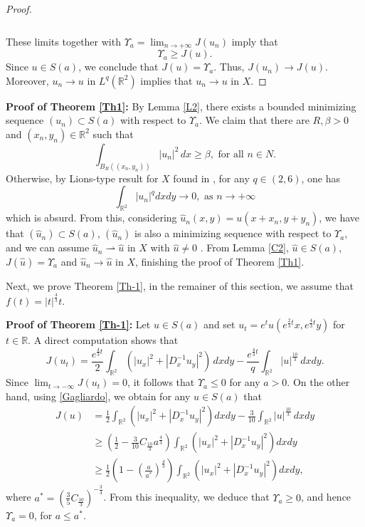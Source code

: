 \documentclass[11pt]{amsart}
\numberwithin{equation}{section}
\newcommand\R{\mathbb R}
\begin{document}
{{{\begin{proof}
\begin{align*}
\end{align*} \\
These limits together with $\Upsilon_a=\displaystyle \lim_{n \to +\infty}J(u_n)$ imply that
$$
\Upsilon_a \geq J(u).
$$
Since $u \in S(a)$, we conclude that $J(u)=\Upsilon_a$. Thus, $J(u_n) \to J(u)$.  Moreover, $u_n \to u$ in $L^{q}(\mathbb{R}^2)$ implies that $u_n \to u$ in $X$.
\end{proof}
\noindent\textbf{Proof of Theorem \ref{Th1}:}
{By Lemma \ref{L2},  there exists a bounded minimizing sequence $(u_n) \subset S(a)$ with respect to $\Upsilon_{a}$. We claim that there are $R,\beta>0$ and $(x_n, y_n) \in \mathbb{R}^2$ such that}
\begin{equation} \label{Lions}
\int_{B_R((x_n, y_n))}|u_n|^2\,dx \geq \beta, \,\, \text{for all}\,\, n \in N.
\end{equation}
Otherwise, by Lions-type result for $X$ found in \cite[Lemma 7.4]{Willem}, for any $q \in\left(2, 6\right)$, one has
$$
\int_{\mathbb{R}^{2}}|u_{n}|^{q} dx dy\rightarrow 0, \,\,\text{as}\,\, n \rightarrow +\infty
$$
which is absurd.  {From this, considering $\hat{u}_n(x, y)=u(x+x_n, y+y_n)$, we have that $(\hat{u}_n) \subset S(a)$,  $(\hat{u}_n)$ is also a minimizing sequence with respect to $\Upsilon_{a}$, and we can assume $\hat{u}_n \rightharpoonup \hat{u}$ in $X$ with $\hat{u} \not= 0$ . From Lemma \ref{C2}, $\hat{u} \in S(a)$, $J(\hat{u})=\Upsilon_a$ and $\hat{u}_n \to \hat{u}$ in $X$, finishing the proof of Theorem \ref{Th1}.}

{Next, we prove Theorem \ref{Th-1}, in the remainer of this section, we assume that $f(t)=|t|^{\frac{4}{3}}t$.}

{
\noindent\textbf{Proof of Theorem \ref{Th-1}:}
Let $u\in S(a)$ and set $u_t=e^{t}u(e^{\frac{2}{3}t}x,e^{\frac{4}{3}t}y) $ for $t\in\R$. {A direct computation shows that}
$$
J(u_t)=\frac{e^{\frac{4}{3}t}}{2}\int_{\mathbb{R}^2}\left(|u_x|^2+|D^{-1}_{x} u_{y}|^2\right)\,dxdy-\frac{e^{\frac{4}{3}t}}{q}\int_{\mathbb{R}^2}|u|^{\frac{10}{3}}\,dxdy.
$$
Since $\displaystyle \lim_{t \rightarrow-\infty}J(u_t)=0$, it follows that $\Upsilon_{a}\leq 0$ for any $a>0$. On the other hand,  using \eqref{Gagliardo}, {we obtain for any $u\in S(a)$ that}\label{key}
$$
\begin{aligned}
    J(u) & =\frac{1}{2}\int_{\mathbb{R}^{2}} \left(|u_{x}|^{2} + |D^{-1}_{x} u_{y}|^{2} \right)dx dy-\frac{3}{10}\int_{\mathbb{R}^2} |u|^{\frac{10}{3}} \,dxdy\\
    & \geq \left(\frac{1}{2}-
    \frac{3}{10}C_{\frac{10}{3}}a^{\frac{4}{3}}
    \right)\int_{\mathbb{R}^{2}} \left(|u_{x}|^{2} + |D^{-1}_{x} u_{y}|^{2} \right)dx dy\\
    & \geq \frac{1}{2}\left(1-
    \left(\frac{a}{a^*}\right)^{\frac{4}{3}}
    \right)\int_{\mathbb{R}^{2}} \left(|u_{x}|^{2} + |D^{-1}_{x} u_{y}|^{2} \right)dx dy,
\end{aligned}
$$
where $a^*=\left(\frac{3}{5}C_{\frac{10}{3}}\right)^{-\frac{3}{4}}$. {From this inequality, we deduce that} $\Upsilon_{a}\geq 0$, and hence $\Upsilon_{a}=0$, for $ a \leq a^{*} $.

}}}}
\end{document}
